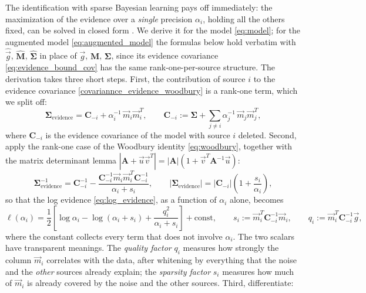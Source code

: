 \documentclass{article}
\begin{document}
The identification with sparse Bayesian learning pays off immediately: the maximization of the evidence over a \emph{single} precision $\alpha_i$, holding all the others fixed, can be solved in closed form \cite{faul2002analysis}. We derive it for the model \eqref{eq:model}; for the augmented model \eqref{eq:augmented_model} the formulas below hold verbatim with $\hat{\vec g}$, $\hat{\mathbf M}$, $\hat{\mathbf\Sigma}$ in place of $\vec g$, $\mathbf M$, $\mathbf\Sigma$, since its evidence covariance \eqref{eq:evidence_bound_cov} has the same rank-one-per-source structure. The derivation takes three short steps. First, the contribution of source $i$ to the evidence covariance \eqref{covariannce_evidence_woodbury} is a rank-one term, which we split off:
\begin{equation}
    \mathbf{\Sigma}_{\text{evidence}} = \mathbf{C}_{-i} + \alpha_i^{-1}\,\vec{m}_i\vec{m}_i^T, \qquad
    \mathbf{C}_{-i} := \mathbf{\Sigma} + \sum_{j\neq i}\alpha_j^{-1}\,\vec{m}_j\vec{m}_j^T, \label{eq:rank_one_split}
\end{equation}
where $\mathbf{C}_{-i}$ is the evidence covariance of the model with source $i$ deleted. Second, apply the rank-one case of the Woodbury identity \eqref{eq:woodbury}, together with the matrix determinant lemma $|\mathbf A + \vec u\vec v^T| = |\mathbf A|(1 + \vec v^T\mathbf A^{-1}\vec u)$:
\begin{equation}
    \mathbf{\Sigma}_{\text{evidence}}^{-1} = \mathbf{C}_{-i}^{-1} - \frac{\mathbf{C}_{-i}^{-1}\vec{m}_i\vec{m}_i^T\mathbf{C}_{-i}^{-1}}{\alpha_i + s_i}, \qquad
    |\mathbf{\Sigma}_{\text{evidence}}| = |\mathbf{C}_{-i}|\left(1 + \frac{s_i}{\alpha_i}\right),
\end{equation}
so that the log evidence \eqref{eq:log_evidence}, as a function of $\alpha_i$ alone, becomes
\begin{equation}
    \ell(\alpha_i) = \frac{1}{2}\left[\log\alpha_i - \log(\alpha_i + s_i) + \frac{q_i^2}{\alpha_i + s_i}\right] + \text{const}, \qquad
    s_i := \vec{m}_i^T \mathbf{C}_{-i}^{-1}\vec{m}_i, \qquad
    q_i := \vec{m}_i^T \mathbf{C}_{-i}^{-1}\vec{g}, \label{eq:sq_factors}
\end{equation}
where the constant collects every term that does not involve $\alpha_i$. The two scalars have transparent meanings. The \emph{quality factor} $q_i$ measures how strongly the column $\vec m_i$ correlates with the data, after whitening by everything that the noise and the \emph{other} sources already explain; the \emph{sparsity factor} $s_i$ measures how much of $\vec m_i$ is already covered by the noise and the other sources. Third, differentiate:
\end{document}
